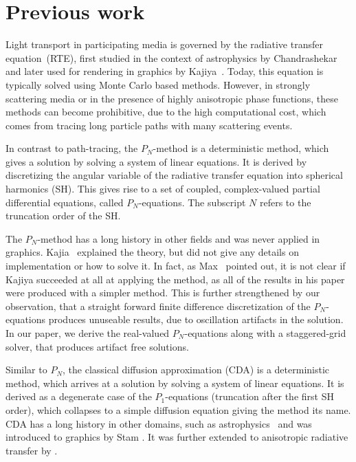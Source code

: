 \section{Previous work}

Light transport in participating media is governed by the radiative transfer equation~(RTE), first studied in the context of astrophysics by Chandrashekar~\cite{Chandrasekhar60} and later used for rendering in graphics by Kajiya~\cite{Kajiya86}. Today, this equation is typically solved using Monte Carlo based methods. However, in strongly scattering media or in the presence of highly anisotropic phase functions, these methods can become prohibitive, due to the high computational cost, which comes from tracing long particle paths with many scattering events.

In contrast to path-tracing, the $P_N$-method is a deterministic method, which gives a solution by solving a system of linear equations. It is derived by discretizing the angular variable of the radiative transfer equation into spherical harmonics (SH). This gives rise to a set of coupled, complex-valued partial differential equations, called $P_N$-equations. The subscript $N$ refers to the truncation order of the SH. 

The $P_N$-method has a long history in other fields and was never applied in graphics. Kajia~\cite{Kajiya84} explained the theory, but did not give any details on implementation or how to solve it. In fact, as Max~\cite{Max95} pointed out, it is not clear if Kajiya succeeded at all at applying the method, as all of the results in his paper were produced with a simpler method. This is further strengthened by our observation, that a straight forward finite difference discretization of the $P_N$-equations produces unuseable results, due to oscillation artifacts in the solution. In our paper, we derive the real-valued $P_N$-equations along with a staggered-grid solver, that produces artifact free solutions.

Similar to $P_N$, the classical diffusion approximation (CDA) is a deterministic method, which arrives at a solution by solving a system of linear equations. It is derived as a degenerate case of the $P_1$-equations (truncation after the first SH order), which collapses to a simple diffusion equation giving the method its name. CDA has a long history in other domains, such as astrophysics~\cite{Ishimaru78} and was introduced to graphics by Stam \cite{Stam95}. It was further extended to anisotropic radiative transfer by \cite{Jakob10}.

